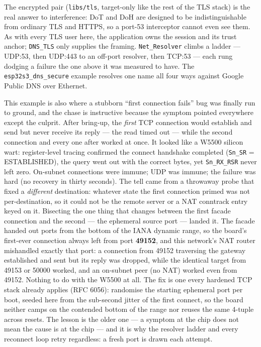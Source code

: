 The encrypted pair (\texttt{libs/tls}, target-only like the rest of the TLS
stack) is the real answer to interference: DoT and DoH are designed to be
indistinguishable from ordinary TLS and HTTPS, so a port-53 interceptor
cannot even see them. As with every TLS user here, the application owns the
session and its trust anchor; \texttt{DNS\_TLS} only supplies the framing.
\texttt{Net\_Resolver} climbs a ladder --- UDP:53, then UDP:443 to an off-port
resolver, then TCP:53 --- each rung dodging a failure the one above it was
measured to have. The \texttt{esp32s3\_dns\_secure} example resolves one name
all four ways against Google Public DNS over Ethernet.

This example is also where a stubborn ``first connection fails'' bug was finally
run to ground, and the chase is instructive because the symptom pointed
everywhere except the culprit. After bring-up, the \emph{first} TCP connection
would establish and send but never receive its reply --- the read timed out ---
while the second connection and every one after worked at once. It looked like a
W5500 silicon wart: register-level tracing confirmed the connect handshake
completed (\texttt{Sn\_SR} = ESTABLISHED), the query went out with the correct
bytes, yet \texttt{Sn\_RX\_RSR} never left zero. On-subnet connections were
immune; UDP was immune; the failure was hard (no recovery in thirty seconds).
The tell came from a throwaway probe that fixed a \emph{different} destination:
whatever state the first connection primed was not per-destination, so it could
not be the remote server or a NAT conntrack entry keyed on it. Bisecting the one
thing that changes between the first facade connection and the second --- the
ephemeral source port --- landed it. The facade handed out ports from the bottom
of the IANA dynamic range, so the board's first-ever connection always left from
port \textbf{49152}, and this network's NAT router mishandled exactly that port:
a connection from 49152 traversing the gateway established and sent but its reply
was dropped, while the identical target from 49153 or 50000 worked, and an
on-subnet peer (no NAT) worked even from 49152. Nothing to do with the W5500 at
all. The fix is one every hardened TCP stack already applies (RFC 6056):
randomise the starting ephemeral port per boot, seeded here from the sub-second
jitter of the first connect, so the board neither camps on the contended bottom
of the range nor reuses the same 4-tuple across resets. The lesson is the older
one --- a symptom at the chip does not mean the cause is at the chip --- and it
is why the resolver ladder and every reconnect loop retry regardless: a fresh
port is drawn each attempt.

